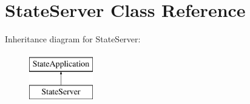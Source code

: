 \hypertarget{class_state_server}{\section{State\-Server Class Reference}
\label{class_state_server}
}
Inheritance diagram for State\-Server\-:\begin{figure}[H]
\begin{center}
\leavevmode
\includegraphics[height=2.000000cm]{class_state_server}
\end{center}
\end{figure}
